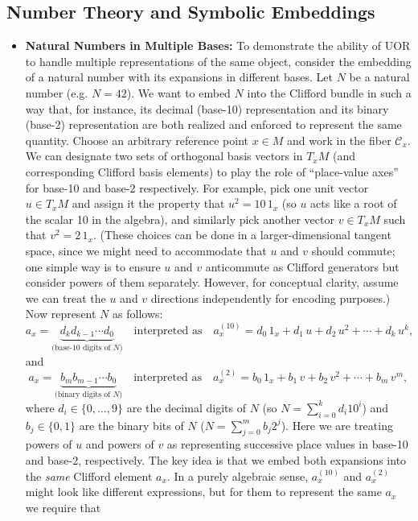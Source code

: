 \documentclass[12pt]{article}
\begin{document}
\subsection{Number Theory and Symbolic Embeddings}
\begin{itemize}
    \item \textbf{Natural Numbers in Multiple Bases:} To demonstrate the ability of UOR to handle multiple representations of the same object, consider the embedding of a natural number with its expansions in different bases. Let $N$ be a natural number (e.g. $N=42$). We want to embed $N$ into the Clifford bundle in such a way that, for instance, its decimal (base-10) representation and its binary (base-2) representation are both realized and enforced to represent the same quantity. Choose an arbitrary reference point $x \in M$ and work in the fiber $\mathcal{C}_x$. We can designate two sets of orthogonal basis vectors in $T_xM$ (and corresponding Clifford basis elements) to play the role of “place-value axes” for base-10 and base-2 respectively. For example, pick one unit vector $u \in T_xM$ and assign it the property that $u^2 = 10\,1_x$ (so $u$ acts like a root of the scalar 10 in the algebra), and similarly pick another vector $v \in T_xM$ such that $v^2 = 2\,1_x$. (These choices can be done in a larger-dimensional tangent space, since we might need to accommodate that $u$ and $v$ should commute; one simple way is to ensure $u$ and $v$ anticommute as Clifford generators but consider powers of them separately. However, for conceptual clarity, assume we can treat the $u$ and $v$ directions independently for encoding purposes.) Now represent $N$ as follows:
    \[
        a_x = \underbrace{d_k d_{k-1} \cdots d_0}_{\text{(base-10 digits of $N$)}} \quad \text{interpreted as} \quad a_x^{(10)} = d_0\,1_x + d_1\,u + d_2\,u^2 + \cdots + d_k\,u^k,
    \] 
    and 
    \[
        a_x = \underbrace{b_m b_{m-1} \cdots b_0}_{\text{(binary digits of $N$)}} \quad \text{interpreted as} \quad a_x^{(2)} = b_0\,1_x + b_1\,v + b_2\,v^2 + \cdots + b_m\,v^m,
    \] 
    where $d_i \in \{0,\dots,9\}$ are the decimal digits of $N$ (so $N = \sum_{i=0}^k d_i 10^i$) and $b_j \in \{0,1\}$ are the binary bits of $N$ ($N=\sum_{j=0}^m b_j 2^j$). Here we are treating powers of $u$ and powers of $v$ as representing successive place values in base-10 and base-2, respectively. The key idea is that we embed both expansions into the \emph{same} Clifford element $a_x$. In a purely algebraic sense, $a_x^{(10)}$ and $a_x^{(2)}$ might look like different expressions, but for them to represent the same $a_x$ we require that 

\end{itemize}
\end{document}
